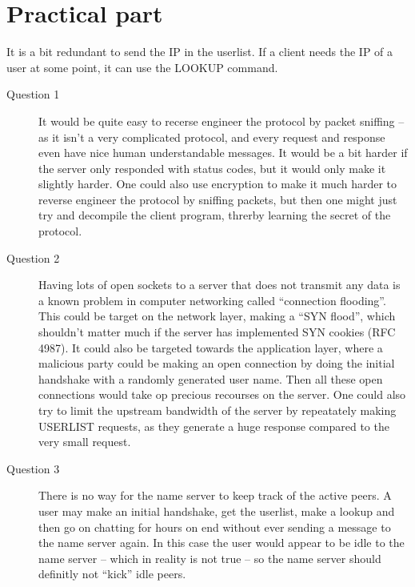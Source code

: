 \section{Practical part}

It is a bit redundant to send the IP in the userlist. If a client needs the IP of a user at some point, it can use the LOOKUP command.


\begin{description} %
    \item[Question 1]
        It would be quite easy to recerse engineer the protocol by packet sniffing -- as it isn't a very complicated protocol, and every request and response even have nice human understandable messages. It would be a bit harder if the server only responded with status codes, but it would only make it slightly harder.
        One could also use encryption to make it much harder to reverse engineer the protocol by sniffing packets, but then one might just try and decompile the client program, threrby learning the secret of the protocol.


    \item[Question 2]
        Having lots of open sockets to a server that does not transmit any data is a known problem in computer networking called ``connection flooding''. This could be target on the network layer, making a ``SYN flood'', which shouldn't matter much if the server has implemented SYN cookies (RFC 4987). It could also be targeted towards the application layer, where a malicious party could be making an open connection by doing the initial handshake with a randomly generated user name. Then all these open connections would take op precious recourses on the server. One could also try to limit the upstream bandwidth of the server by repeatately making USERLIST requests, as they generate a huge response compared to the very small request.

    \item[Question 3]
        There is no way for the name server to keep track of the active peers. A user may make an initial handshake, get the userlist, make a lookup and then go on chatting for hours on end without ever sending a message to the name server again. In this case the user would appear to be idle to the name server -- which in reality is not true -- so the name server should definitly not ``kick'' idle peers.


\end{description}
